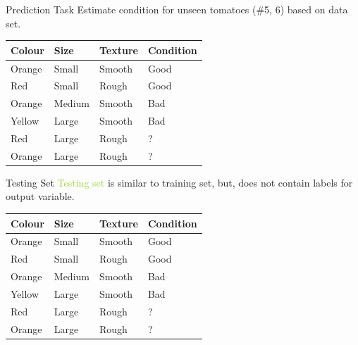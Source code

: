 \documentclass[usenames,dvipsnames]{beamer}
\begin{document}
\begin{frame}{Prediction Task}
Estimate condition for unseen tomatoes (\#5, 6) based on data set. 

\begin{table}[]
	\begin{tabular}{|l|l|l||l|}
		\hline 
		
		\textbf{Colour} & \textbf{Size} & \textbf{Texture} & \textbf{Condition} \\ \hline 
		Orange & Small & Smooth  & Good      \\
		Red    & Small  & Rough  & Good \\
		Orange & Medium & Smooth & Bad \\
		Yellow & Large  & Smooth & Bad \\ \hline
		Red    & Large  & Rough  & ? \\
		Orange &  Large & Rough  & ? \\ \hline          
	\end{tabular}
\end{table}
\end{frame}

\begin{frame}{Testing Set}
\textcolor{YellowGreen}{Testing set} is similar to \textcolor{Peach}{training set}, but, does not contain labels for output variable. 

\begin{table}[]
	\begin{tabular}{|l|l|l||l|}
		\hline 
		\textbf{Colour} & \textbf{Size} & \textbf{Texture} & \textbf{Condition} \\ \hline 
		\rowcolor{Peach}
		Orange & Small & Smooth  & Good      \\
		\rowcolor{Peach}
		Red    & Small  & Rough  & Good \\
		\rowcolor{Peach}
		Orange & Medium & Smooth & Bad \\
		\rowcolor{Peach}
		Yellow & Large  & Smooth & Bad \\ \hline
				\rowcolor{YellowGreen}
		Red    & Large  & Rough  & ? \\
		\rowcolor{YellowGreen}
		Orange &  Large & Rough  & ? \\ \hline          
	\end{tabular}
\end{table}
\end{frame}
\end{document}
